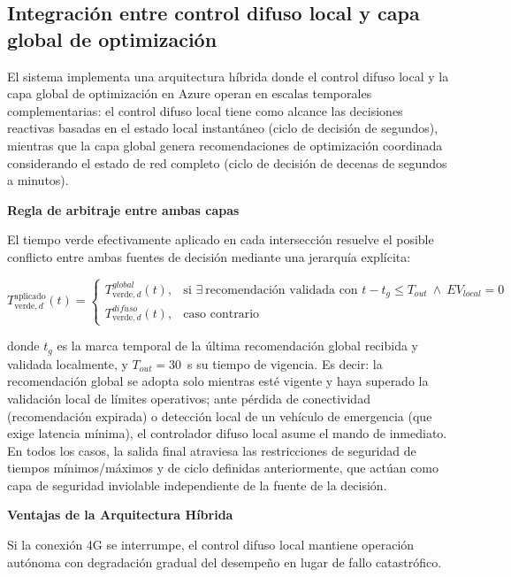 \documentclass[12pt,a4paper,oneside]{report}
\newenvironment{centeredmath}
  {\begin{center}\begin{adjustbox}{max width=0.96\linewidth}\(\displaystyle}
  {\)\end{adjustbox}\end{center}}
\begin{document}
\subsection{Integración entre control difuso local y capa global de optimización}\label{integraciuxf3n-entre-control-difuso-local-y-motor-rl-global}

El sistema implementa una arquitectura híbrida donde el control difuso local y la capa global de optimización en Azure operan en escalas temporales complementarias: el control difuso local tiene como alcance las decisiones reactivas basadas en el estado local instantáneo (ciclo de decisión de segundos), mientras que la capa global genera recomendaciones de optimización coordinada considerando el estado de red completo (ciclo de decisión de decenas de segundos a minutos).

\textbf{Regla de arbitraje entre ambas capas}

El tiempo verde efectivamente aplicado en cada intersección resuelve el posible conflicto entre ambas fuentes de decisión mediante una jerarquía explícita:

\begin{centeredmath}
T_{\text{verde},d}^{\text{aplicado}}(t) =
\begin{cases}
T_{\text{verde},d}^{global}(t), & \text{si } \exists\ \text{recomendación validada con } t - t_{g} \leq T_{out} \ \land\ EV_{local} = 0\\[3pt]
T_{\text{verde},d}^{difuso}(t), & \text{caso contrario}
\end{cases}
\end{centeredmath}

donde \(t_{g}\) es la marca temporal de la última recomendación global recibida y validada localmente, y \(T_{out} = 30\)~s su tiempo de vigencia. Es decir: la recomendación global se adopta solo mientras esté vigente y haya superado la validación local de límites operativos; ante pérdida de conectividad (recomendación expirada) o detección local de un vehículo de emergencia (que exige latencia mínima), el controlador difuso local asume el mando de inmediato. En todos los casos, la salida final atraviesa las restricciones de seguridad de tiempos mínimos/máximos y de ciclo definidas anteriormente, que actúan como capa de seguridad inviolable independiente de la fuente de la decisión.

\textbf{Ventajas de la Arquitectura Híbrida}

Si la conexión 4G se interrumpe, el control difuso local mantiene operación autónoma con degradación gradual del desempeño en lugar de fallo catastrófico.
\end{document}
